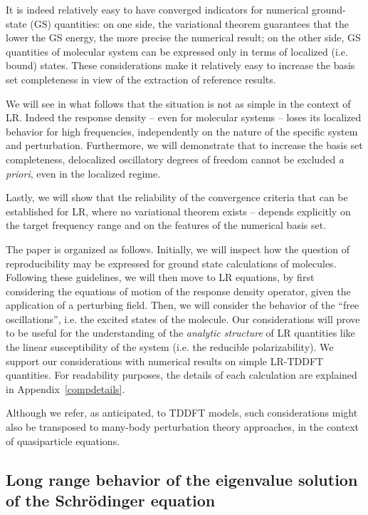 \documentclass[reprint,aps,prb]{revtex4-1}
\begin{document}
It is indeed relatively easy to have converged indicators for numerical ground-state (GS) quantities: on one side, the variational theorem
guarantees that the lower the GS energy, the more precise the numerical result; on the other side, GS quantities of molecular system  can be expressed only in terms of localized (i.e. bound) states. These considerations make it relatively easy to increase the basis set completeness in view of the extraction of reference results.

We will see in what follows that the situation is not as simple in the context of LR. Indeed the response density -- even for molecular systems -- loses its localized behavior for high frequencies, independently on the nature of the specific system and perturbation. Furthermore, we will demonstrate that to increase the basis set completeness, delocalized oscillatory degrees of freedom cannot be excluded \textit{a priori}, even in the localized regime.

Lastly, we will show that the reliability of the convergence criteria that can be established for LR, where no variational theorem exists -- depends explicitly on the target frequency range and on the features of the numerical basis set.

The paper is organized as follows.
Initially, we will inspect how the question of reproducibility may be expressed
for ground state calculations of molecules.
Following these guidelines, we will then move to LR equations,
by first considering the equations of motion of the response density operator, given
the application of a perturbing field.
Then, we will consider the behavior of the ``free oscillations'', i.e. the excited states
of the molecule.
Our considerations will prove to be useful for the understanding of the \emph{analytic structure} of LR quantities like
the linear susceptibility of the system (i.e. the reducible polarizability).
We support our considerations with numerical results on simple LR-TDDFT quantities.
For readability purposes, the details of each calculation are explained in Appendix~\ref{compdetails}.

Although we refer, as anticipated, to TDDFT models, such considerations might also be transposed to many-body perturbation theory
approaches, in the context of quasiparticle equations.

\subsection{Long range behavior of the eigenvalue solution of the Schr\"odinger equation}
\label{SEopenSystem}
\end{document}
